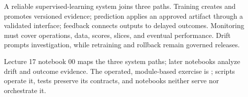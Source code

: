 \begin{chapterreview}
A reliable supervised-learning system joins three paths. Training creates and
promotes versioned evidence; prediction applies an approved artifact through a
validated interface; feedback connects outputs to delayed outcomes. Monitoring
must cover operations, data, scores, slices, and eventual performance. Drift
prompts investigation, while retraining and rollback remain governed releases.
\end{chapterreview}

\begin{notebooklink}
Lecture 17 notebook 00 maps the three system paths; later notebooks analyze
drift and outcome evidence. The operated, module-based exercise is
; scripts operate it, tests preserve
its contracts, and notebooks neither serve nor orchestrate it.
\end{notebooklink}
